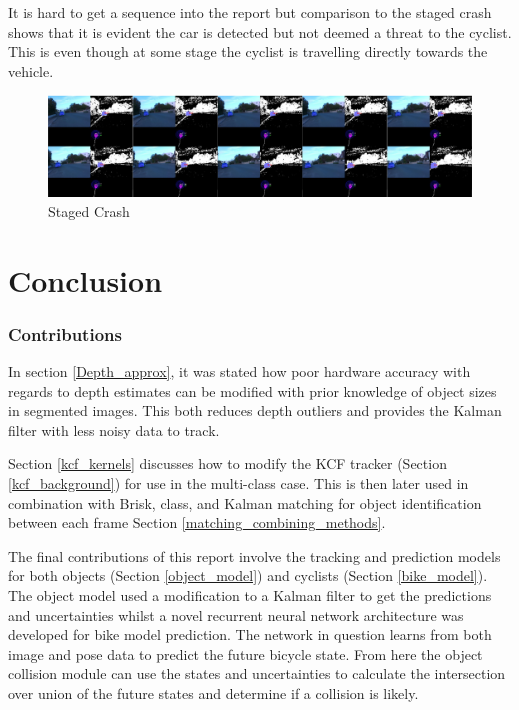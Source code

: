 \documentclass[11pt,twoside]{report}
\begin{document}
It is hard to get a sequence into the report but comparison to the staged crash shows that it is evident the car is detected but not deemed a threat to the cyclist. This is even though at some stage the cyclist is travelling directly towards the vehicle.

\noindent \begin{figure}[h!]
	\includegraphics[width = 1.0\hsize]{figures/no_crash.png}
	\caption{Staged Crash}
	\label{mrcnn_fail}
\end{figure}



\chapter{Conclusion}

\subsection{Contributions}

In section \ref{Depth_approx}, it was stated how poor hardware accuracy with regards to depth estimates can be modified with prior knowledge of object sizes in segmented images. This both reduces depth outliers and provides the Kalman filter with less noisy data to track.

Section \ref{kcf_kernels} discusses how to modify the KCF tracker (Section \ref{kcf_background}) for use in the multi-class case. This is then later used in combination with Brisk, class, and Kalman matching for object identification between each frame Section \ref{matching_combining_methods}.

The final contributions of this report involve the tracking and prediction models for both objects (Section \ref{object_model}) and cyclists (Section \ref{bike_model}). The object model used a modification to a Kalman filter to get the predictions and uncertainties whilst a novel recurrent neural network architecture was developed for bike model prediction. The network in question learns from both image and pose data to predict the future bicycle state. From here the object collision module can use the states and uncertainties to calculate the intersection over union of the future states and determine if a collision is likely.
\end{document}
